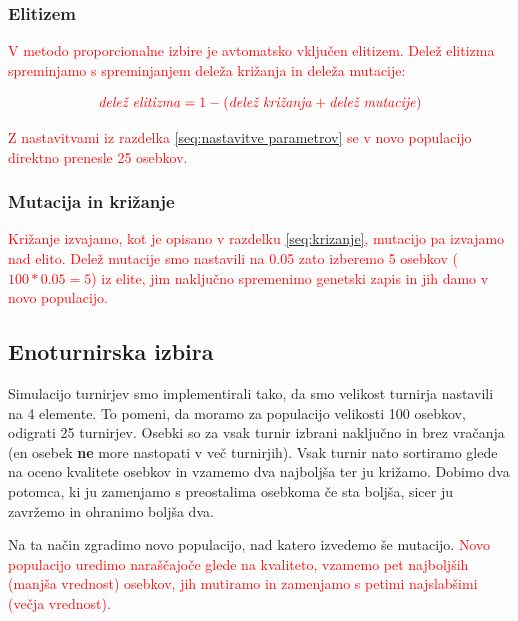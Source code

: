 \documentclass[a4paper, 12pt]{book}
\begin{document}
\newpage
\subsubsection{Elitizem}

\textcolor{red}{V metodo proporcionalne izbire je avtomatsko vklju\v cen elitizem. Dele\v z elitizma spreminjamo s spreminjanjem dele\v za kri\v zanja in dele\v za mutacije:}

\begin{equation}
\label{eq:elitizem}
\textcolor{red}{\textrm{\textit{dele\v z elitizma}} = 1 - (\textrm{\textit{dele\v z kri\v zanja}} + \textrm{\textit{dele\v z mutacije}})}
\end{equation}

\textcolor{red}{Z nastavitvami iz razdelka \ref{seq:nastavitve parametrov} se v novo populacijo direktno prenesle 25 osebkov.}

\subsubsection{Mutacija in kri\v zanje}

\textcolor{red}{Kri\v zanje izvajamo, kot je opisano v razdelku \ref{seq:krizanje}, mutacijo pa izvajamo nad elito. Dele\v z mutacije smo nastavili na 0.05 zato izberemo 5 osebkov ($100*0.05 = 5$) iz elite, jim naklju\v cno spremenimo genetski zapis in jih damo v novo populacijo.}

\subsection{Enoturnirska izbira}

Simulacijo turnirjev smo implementirali tako, da smo velikost turnirja nastavili na 4 elemente. To pomeni, da moramo za populacijo velikosti 100 osebkov, odigrati 25 turnirjev. Osebki so za vsak turnir izbrani naklju\v cno in brez vra\v canja (en osebek \textbf{ne} more nastopati v ve\v c turnirjih). Vsak turnir nato sortiramo glede na oceno kvalitete osebkov in vzamemo dva najbolj\v sa ter ju kri\v zamo. Dobimo dva potomca, ki ju zamenjamo s preostalima osebkoma \v ce sta bolj\v sa, sicer ju zavr\v zemo in ohranimo bolj\v sa dva. 

Na ta na\v cin zgradimo novo populacijo, nad katero izvedemo \v se mutacijo. \textcolor{red}{Novo populacijo uredimo nara\v s\v cajo\v ce glede na kvaliteto, vzamemo pet najbolj\v sih (manj\v sa vrednost) osebkov, jih mutiramo in zamenjamo s petimi najslab\v simi (ve\v cja vrednost).}
\end{document}
